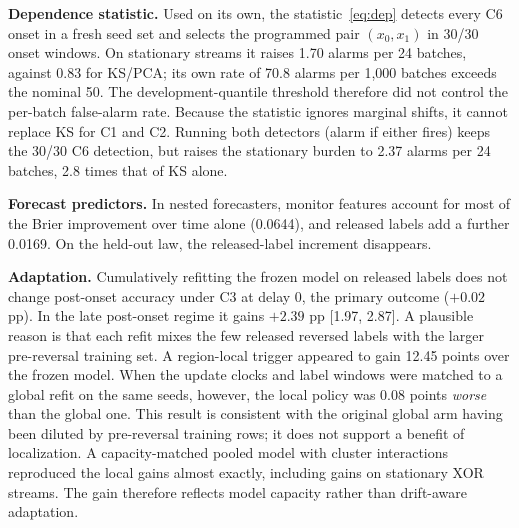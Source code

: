 \textbf{Dependence statistic.} Used on its own, the statistic~\eqref{eq:dep} detects every
C6 onset in a fresh seed set and selects the programmed pair $(x_0,x_1)$ in 30/30 onset windows. On stationary streams it raises 1.70 alarms per 24 batches, against 0.83 for KS/PCA;
its own rate of 70.8 alarms per 1,000 batches exceeds the nominal 50. The development-quantile threshold therefore did
not control the per-batch false-alarm rate. Because the statistic ignores marginal shifts, it cannot replace KS for C1 and C2.
Running both detectors (alarm if either fires) keeps the 30/30 C6 detection, but raises
the stationary burden to 2.37 alarms per 24 batches, 2.8 times that of KS alone.

\textbf{Forecast predictors.} In nested forecasters, monitor features account for most
of the Brier improvement over time alone (0.0644), and released labels add a further
0.0169. On the held-out law, the released-label increment disappears.

\textbf{Adaptation.} Cumulatively refitting the frozen model on released labels does not
change post-onset accuracy under C3 at delay 0, the primary outcome ($+0.02$ pp). In
the late post-onset regime it gains $+2.39$ pp [1.97, 2.87]. A plausible reason is that
each refit mixes the few released reversed labels with the larger pre-reversal training
set. A region-local
trigger appeared to gain 12.45 points over the frozen model. When the update clocks and
label windows were matched to a global refit on the same seeds, however, the local
policy was 0.08 points \emph{worse} than the global one. This result is consistent with
the original global arm having been diluted by pre-reversal training rows; it does not
support a benefit of localization. A
capacity-matched pooled model with cluster interactions reproduced the local gains
almost exactly, including gains on stationary XOR streams. The gain therefore reflects
model capacity rather than drift-aware adaptation.
